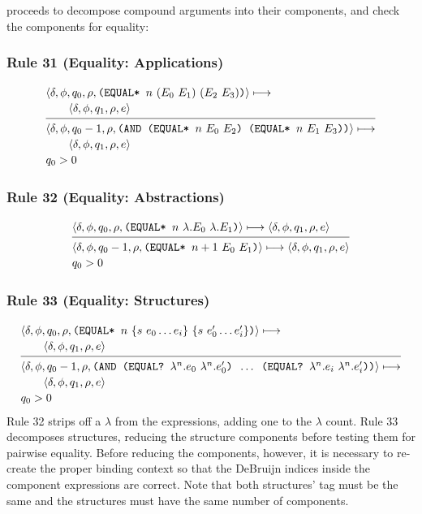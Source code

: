  proceeds to decompose compound arguments into their components,
and check the components for equality:

\subsubsection*{Rule 31 (Equality: Applications)}
\[
\semanticrule{
\cfg{\delta}{\phi}{q_0}{\rho}{\THOR{(EQUAL* }n\ (E_0\ E_1)\ (E_2\ E_3)\THOR{)}}\redsto\\ \qquad
\cfg{\delta}{\phi}{q_1}{\rho}{e}
}{
\cfg{\delta}{\phi}{q_0-1}{\rho}{\THOR{(AND (EQUAL* }n\ E_0\ E_2\THOR{) (EQUAL* }n\ E_1\ E_3\THOR{))}}\redsto\\ \qquad
\cfg{\delta}{\phi}{q_1}{\rho}{e}\\
q_0>0
}
\]

\subsubsection*{Rule 32 (Equality: Abstractions)}
\[
\semanticrule{
\cfg{\delta}{\phi}{q_0}{\rho}{\THOR{(EQUAL* }n\ \lambda.E_0\ \lambda.E_1\THOR{)}}\redsto
\cfg{\delta}{\phi}{q_1}{\rho}{e}
}{
\cfg{\delta}{\phi}{q_0-1}{\rho}{\THOR{(EQUAL* }n+1\ E_0\ E_1\THOR{)}}\redsto
\cfg{\delta}{\phi}{q_1}{\rho}{e}\\
q_0>0
}
\]

\subsubsection*{Rule 33 (Equality: Structures)}
\[
\semanticrule{
\cfg{\delta}{\phi}{q_0}{\rho}{\THOR{(EQUAL* }n\ \{s\ e_0\ldots e_i\}\ \{s\ e'_0\ldots e'_i\}\THOR{)}}\redsto\\ \qquad
\cfg{\delta}{\phi}{q_1}{\rho}{e}
}{
\cfg{\delta}{\phi}{q_0-1}{\rho}{\THOR{(AND (EQUAL? }\lambda^n.e_0\ \lambda^n.e'_0\THOR{) }\ldots\THOR{ (EQUAL? }\lambda^n.e_i\ \lambda^n.e'_i\THOR{))}}\redsto\\ \qquad
\cfg{\delta}{\phi}{q_1}{\rho}{e}\\
q_0>0
}
\]
Rule 32 strips off a \(\lambda\) from the expressions, adding one to the
\(\lambda\) count. Rule 33 decomposes structures, reducing the structure
components before testing them for pairwise equality. Before reducing the
components, however, it is necessary to re-create the proper binding context so
that the DeBruijn indices inside the component expressions are correct. Note
that both structures' tag must be the same and the structures must have the same
number of components.

